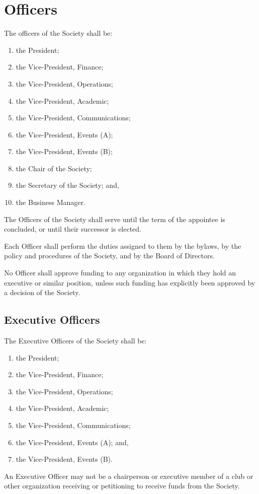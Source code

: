 \section{Officers}

The officers of the Society shall be:
\begin{enumerate}
    \item the President; 
    \item the Vice-President, Finance; 
    \item the Vice-President, Operations; 
    \item the Vice-President, Academic;
    \item the Vice-President, Communications;
    \item the Vice-President, Events (A);
    \item the Vice-President, Events (B);
    \item the Chair of the Society;
    \item the Secretary of the Society; and,
    \item the Business Manager.
\end{enumerate}

The Officers of the Society shall serve until the term of the appointee is
concluded, or until their successor is elected. 

Each Officer shall perform the duties assigned to them by the bylaws, by the
policy and procedures of the Society, and by the Board of Directors.

No Officer shall approve funding to any organization in which they hold an
executive or similar position, unless such funding has explicitly been approved
by a decision of the Society.

\subsection{Executive Officers}
The Executive Officers of the Society shall be: \begin{enumerate}
    \item the President; 
    \item the Vice-President, Finance; 
    \item the Vice-President, Operations; 
    \item the Vice-President, Academic;
    \item the Vice-President, Communications;
    \item the Vice-President, Events (A); and,
    \item the Vice-President, Events (B).
\end{enumerate}
An Executive Officer may not be a chairperson or executive member of a club or other 
organization receiving or petitioning to receive funds from the Society.

